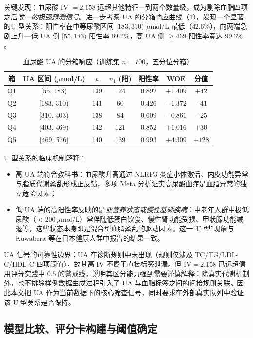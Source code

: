 \documentclass{MathorCupmodeling}
\providecommand{\tightlist}{%
  \setlength{\itemsep}{0pt}\setlength{\parskip}{0pt}}
\begin{document}
关键发现：血尿酸 IV $=2.158$ 远超其他特征一到两个数量级，成为剔除血脂四项之后\emph{唯一的极强预测信号}。进一步考察 UA 的分箱响应曲线（\cref{tab:q2-ua-bins}），发现一个显著的U 型关系：阳性率在中等尿酸区间 $[183,310)$ $\mu$mol/L 最低（$42.6\%$），向两端急剧上升---低 UA 侧 $[55,183)$ 阳性率 $89.2\%$，高 UA 侧 $\ge 469$ 阳性率竟达 $99.3\%$。

\begin{table}[H]
\centering\small
\caption{血尿酸 UA 的分箱响应（训练集 $n=700$，五分位分箱）}\label{tab:q2-ua-bins}
\begin{tabular}{@{}c c c c c c c@{}}
\toprule
箱 & UA 区间 ($\mu$mol/L) & $n$ & $n_1$ (阳) & 阳性率 & WOE & 分值 \\
\midrule
Q1 & [55, 183)   & 139 & 124 & $0.892$ & $+1.409$ & $+42$ \\
Q2 & [183, 310)  & 141 & \phantom{0}60 & $0.426$ & $-1.372$ & $-41$ \\
Q3 & [310, 403)  & 138 & \phantom{0}84 & $0.609$ & $-0.861$ & $-25$ \\
Q4 & [403, 469)  & 142 & 121 & $0.852$ & $+1.016$ & $+30$ \\
Q5 & [469, 576] & 140 & 139 & $0.993$ & $+4.309$ & $+128$ \\
\bottomrule
\end{tabular}
\end{table}

U 型关系的临床机制解释：
\begin{itemize}
\tightlist
\item 高 UA 端符合教科书：血尿酸升高通过 NLRP3 炎症小体激活、内皮功能异常与脂质代谢紊乱形成正反馈，多项 Meta 分析证实高尿酸血症是血脂异常的独立危险因素\cite{yuchunquan2015}；
\item 低 UA 端的高阳性率反映的是\emph{亚营养状态或慢性基础疾病}：中老年人群中极低尿酸（$<200~\mu$mol/L）常伴随低蛋白饮食、慢性肾功能受损、甲状腺功能减退等，这些状态本身即是混合型血脂紊乱的驱动因素。这一``U 型''现象与 Kuwabara 等在日本健康人群中报告的结果\cite{kuwabara2016uric}一致。
\end{itemize}
UA 信号的可靠性边界：UA 在诊断规则中未出现（规则仅涉及 TC/TG/LDL-C/HDL-C 四项阈值），故其高 IV 不属于直接标签泄漏。但 $\mathrm{IV}=2.158$ 已远超信用评分实践中 $0.5$ 的警戒线，说明其区分能力强到需要谨慎解释：除真实代谢机制外，也不排除样例数据生成过程引入了 UA 与血脂标签之间的间接规则关联。因此本文把 UA 作为当前数据下的核心筛查信号，同时要求在外部真实队列中验证该 U 型关系是否保持。

\subsection{模型比较、评分卡构建与阈值确定}
\end{document}
